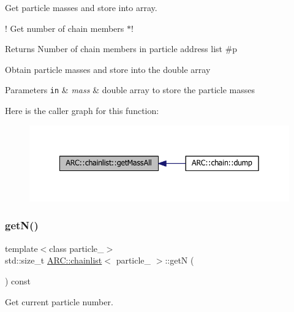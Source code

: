 Get particle masses and store into array. 

! Get number of chain members $\ast$! \begin{DoxyReturn}{Returns}
Number of chain members in particle address list \#p
\end{DoxyReturn}
Obtain particle masses and store into the double array 
\begin{DoxyParams}[1]{Parameters}
\mbox{\tt in}  & {\em mass} & double array to store the particle masses \\
\hline
\end{DoxyParams}
Here is the caller graph for this function\+:
\nopagebreak
\begin{figure}[H]
\begin{center}
\leavevmode
\includegraphics[width=342pt]{classARC_1_1chainlist_a85bba1921256d2a1a6784006927ad397_icgraph}
\end{center}
\end{figure}
\hypertarget{classARC_1_1chainlist_a4292d4468e5d710392f11cee0c1f01b9}{}\label{classARC_1_1chainlist_a4292d4468e5d710392f11cee0c1f01b9} 
\subsubsection{\texorpdfstring{get\+N()}{getN()}}
{\footnotesize\ttfamily template$<$class particle\+\_\+$>$ \\
std\+::size\+\_\+t \hyperlink{classARC_1_1chainlist}{A\+R\+C\+::chainlist}$<$ particle\+\_\+ $>$\+::getN (\begin{DoxyParamCaption}{ }\end{DoxyParamCaption}) const\hspace{0.3cm}{\ttfamily [inline]}}



Get current particle number. 

